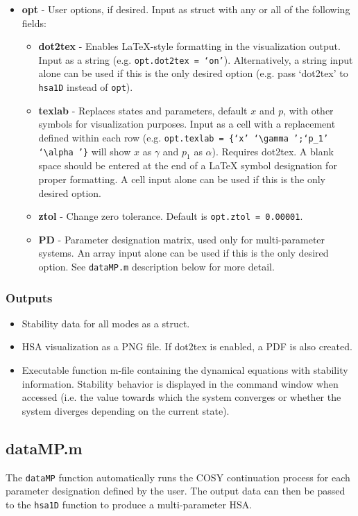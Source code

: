 \documentclass[12pt]{article}
\begin{document}
\begin{itemize}
\item \textbf{opt} - User options, if desired. Input as struct with any or all of the following fields:
	\begin{itemize}
	\item \textbf{dot2tex} - Enables LaTeX-style formatting in the visualization output. Input as a string (e.g. \texttt{opt.dot2tex = `on'}). Alternatively, a string input alone can be used if this is the only desired option (e.g. pass `dot2tex' to \texttt{hsa1D} instead of \texttt{opt}).
	\item \textbf{texlab} - Replaces states and parameters, default $x$ and $p$, with other symbols for visualization purposes. Input as a cell with a replacement defined within each row (e.g. \texttt{opt.texlab = \{`x' `\textbackslash gamma ';`p\_1' `\textbackslash alpha '\}} will show $x$ as $\gamma$ and $p_1$ as $\alpha$). Requires dot2tex. A blank space should be entered at the end of a LaTeX symbol designation for proper formatting. A cell input alone can be used if this is the only desired option.
	\item \textbf{ztol} - Change zero tolerance. Default is \texttt{opt.ztol = 0.00001}. 
	\item \textbf{PD} - Parameter designation matrix, used only for multi-parameter systems. An array input alone can be used if this is the only desired option. See \texttt{dataMP.m} description below for more detail. 
	\end{itemize}
\end{itemize}

\subsubsection{Outputs}
\begin{itemize}
\item Stability data for all modes as a struct.
\item HSA visualization as a PNG file. If dot2tex is enabled, a PDF is also created.
\item Executable function m-file containing the dynamical equations with stability information. Stability behavior is displayed in the command window when accessed (i.e. the value towards which the system converges or whether the system diverges depending on the current state).
\end{itemize}


\subsection{dataMP.m}
The \texttt{dataMP} function automatically runs the COSY continuation process for each parameter designation defined by the user. The output data can then be passed to the \texttt{hsa1D} function to produce a multi-parameter HSA.
\end{document}
